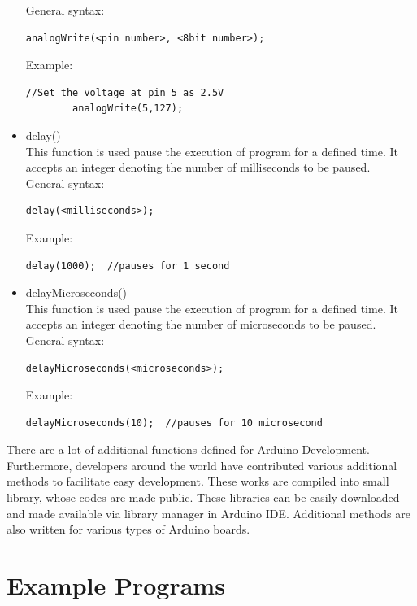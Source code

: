 \begin{itemize}
    General syntax:
     \begin{lstlisting}[style=CStyle]
        analogWrite(<pin number>, <8bit number>);
    \end{lstlisting}
    Example:
     \begin{lstlisting}[style=CStyle]
        //Set the voltage at pin 5 as 2.5V
        analogWrite(5,127);  
    \end{lstlisting}
    
    \item delay()\\
    This function is used pause the execution of program for a defined time. It accepts an integer denoting the number of milliseconds to be paused.\\
    General syntax:
     \begin{lstlisting}[style=CStyle]
        delay(<milliseconds>);
    \end{lstlisting}
    Example:
     \begin{lstlisting}[style=CStyle]
        delay(1000);  //pauses for 1 second
    \end{lstlisting}
        
    \item delayMicroseconds()\\
    This function is used pause the execution of program for a defined time. It accepts an integer denoting the number of microseconds to be paused.\\
    General syntax:
    \begin{lstlisting}[style=CStyle]
        delayMicroseconds(<microseconds>);
    \end{lstlisting}
    Example:
     \begin{lstlisting}[style=CStyle]
        delayMicroseconds(10);  //pauses for 10 microsecond
    \end{lstlisting}
\end{itemize}

\vspace{1cm}

There are a lot of additional functions defined for Arduino Development. Furthermore, developers around the world have contributed various additional methods to facilitate easy development. These works are compiled into small library, whose codes are made public. These libraries can be easily downloaded and made available via library manager in Arduino \ac{IDE}. Additional methods are also written for various types of Arduino boards. 

\newpage
\section{Example Programs}
